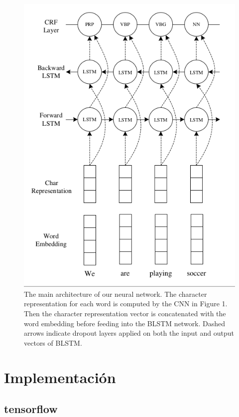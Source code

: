 \documentclass[runningheads]{llncs}
\begin{document}

\begin{figure}
	\centering
	\includegraphics[width=12cm]{Fig_3.png}
	\caption{  The main architecture of our neural
		network. The character representation for each
		word is computed by the CNN in Figure 1. Then
		the character representation vector is concatenated
		with the word embedding before feeding into the
		BLSTM network. Dashed arrows indicate dropout
		layers applied on both the input and output vectors
		of BLSTM.}
	\label{A1}
\end{figure}





\section{Implementación}

\subsection{tensorflow}
\end{document}
